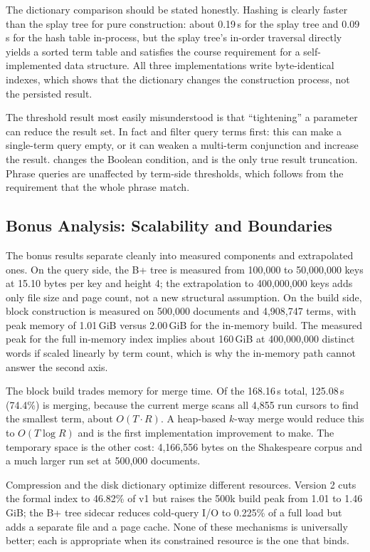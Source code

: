 The dictionary comparison should be stated honestly. Hashing is clearly faster
than the splay tree for pure construction: about 0.19\,s for the splay tree and
0.09\,s for the hash table in-process, but the splay tree's in-order traversal
directly yields a sorted term table and satisfies the course requirement for a
self-implemented data structure. All three implementations write byte-identical
indexes, which shows that the dictionary changes the construction process, not
the persisted result.

The threshold result most easily misunderstood is that ``tightening'' a
parameter can reduce the result set. In fact  and
 filter query terms first: this can make a single-term query
empty, or it can weaken a multi-term conjunction and increase the result.
 changes the Boolean condition, and  is the only
true result truncation. Phrase queries are unaffected by term-side thresholds,
which follows from the requirement that the whole phrase match.

\subsection{Bonus Analysis: Scalability and Boundaries}
\label{sec:bonus-analysis}

The bonus results separate cleanly into measured components and extrapolated
ones. On the query side, the B+ tree is measured from 100,000 to 50,000,000
keys at 15.10 bytes per key and height 4; the extrapolation to 400,000,000 keys
adds only file size and page count, not a new structural assumption. On the
build side, block construction is measured on 500,000 documents and 4,908,747
terms, with peak memory of 1.01\,GiB versus 2.00\,GiB for the in-memory build.
The measured peak for the full in-memory index implies about 160\,GiB at
400,000,000 distinct words if scaled linearly by term count, which is why the
in-memory path cannot answer the second axis.

The block build trades memory for merge time. Of the 168.16\,s total, 125.08\,s
(74.4\%) is merging, because the current merge scans all 4,855 run cursors to
find the smallest term, about $O(T\cdot R)$. A heap-based $k$-way merge would
reduce this to $O(T\log R)$ and is the first implementation improvement to
make. The temporary space is the other cost: 4,166,556 bytes on the
Shakespeare corpus and a much larger run set at 500,000 documents.

Compression and the disk dictionary optimize different resources. Version 2
cuts the formal index to 46.82\% of v1 but raises the 500k build peak from 1.01
to 1.46\,GiB; the B+ tree sidecar reduces cold-query I/O to 0.225\% of a full
load but adds a separate file and a page cache. None of these mechanisms is
universally better; each is appropriate when its constrained resource is the
one that binds.

